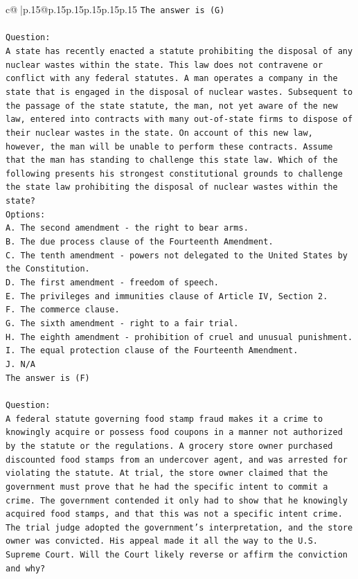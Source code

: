 \documentclass{article}
\begin{document}
{\begin{supertabular}{c@{$\;$}|p{.15\linewidth}@{}p{.15\linewidth}p{.15\linewidth}p{.15\linewidth}p{.15\linewidth}p{.15\linewidth}}
{{{\texttt{The answer is (G)} \\
\\ 
\texttt{Question:} \\
\texttt{A state has recently enacted a statute prohibiting the disposal of any nuclear wastes within the state. This law does not contravene or conflict with any federal statutes. A man operates a company in the state that is engaged in the disposal of nuclear wastes. Subsequent to the passage of the state statute, the man, not yet aware of the new law, entered into contracts with many out{-}of{-}state firms to dispose of their nuclear wastes in the state. On account of this new law, however, the man will be unable to perform these contracts. Assume that the man has standing to challenge this state law. Which of the following presents his strongest constitutional grounds to challenge the state law prohibiting the disposal of nuclear wastes within the state?} \\
\texttt{Options:} \\
\texttt{A. The second amendment {-} the right to bear arms.} \\
\texttt{B. The due process clause of the Fourteenth Amendment.} \\
\texttt{C. The tenth amendment {-} powers not delegated to the United States by the Constitution.} \\
\texttt{D. The first amendment {-} freedom of speech.} \\
\texttt{E. The privileges and immunities clause of Article IV, Section 2.} \\
\texttt{F. The commerce clause.} \\
\texttt{G. The sixth amendment {-} right to a fair trial.} \\
\texttt{H. The eighth amendment {-} prohibition of cruel and unusual punishment.} \\
\texttt{I. The equal protection clause of the Fourteenth Amendment.} \\
\texttt{J. N/A} \\
\texttt{The answer is (F)} \\
\\ 
\texttt{Question:} \\
\texttt{A federal statute governing food stamp fraud makes it a crime to knowingly acquire or possess food coupons in a manner not authorized by the statute or the regulations. A grocery store owner purchased discounted food stamps from an undercover agent, and was arrested for violating the statute. At trial, the store owner claimed that the government must prove that he had the specific intent to commit a crime. The government contended it only had to show that he knowingly acquired food stamps, and that this was not a specific intent crime. The trial judge adopted the government's interpretation, and the store owner was convicted. His appeal made it all the way to the U.S. Supreme Court. Will the Court likely reverse or affirm the conviction and why?} \\
}}}
\end{supertabular}}
\end{document}
